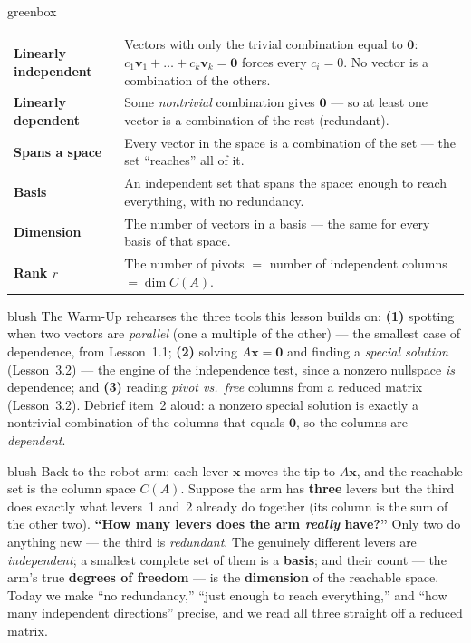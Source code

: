 \documentclass[10pt]{article}
\newcommand{\vv}{\mathbf{v}}
\newcommand{\xx}{\mathbf{x}}
\newcommand{\zero}{\mathbf{0}}
\begin{document}
\begin{skillbox}{greenbox}
\renewcommand{\arraystretch}{1.3}
\begin{tabularx}{\linewidth}{@{}l X@{}}
\textbf{Linearly independent} & Vectors with only the trivial combination equal to $\zero$: $c_1\vv_1+\dots+c_k\vv_k=\zero$ forces every $c_i=0$. No vector is a combination of the others. \\
\textbf{Linearly dependent} & Some \emph{nontrivial} combination gives $\zero$ --- so at least one vector is a combination of the rest (redundant). \\
\textbf{Spans a space} & Every vector in the space is a combination of the set --- the set ``reaches'' all of it. \\
\textbf{Basis} & An independent set that spans the space: enough to reach everything, with no redundancy. \\
\textbf{Dimension} & The number of vectors in a basis --- the same for every basis of that space. \\
\textbf{Rank $r$} & The number of pivots $=$ number of independent columns $=\dim C(A)$. \\
\end{tabularx}
\end{skillbox}

\begin{fixedskillbox}{blush}
    The Warm-Up rehearses the three tools this lesson builds on: \textbf{(1)} spotting when two vectors are
    \emph{parallel} (one a multiple of the other) --- the smallest case of dependence, from Lesson~1.1;
    \textbf{(2)} solving $A\xx=\zero$ and finding a \emph{special solution} (Lesson~3.2) --- the engine of
    the independence test, since a nonzero nullspace \emph{is} dependence; and \textbf{(3)} reading
    \emph{pivot vs.\ free} columns from a reduced matrix (Lesson~3.2). Debrief item~2 aloud: a nonzero
    special solution is exactly a nontrivial combination of the columns that equals $\zero$, so the columns
    are \emph{dependent}.
\end{fixedskillbox}

\begin{skillbox}[Hook]{blush}
    Back to the robot arm: each lever $\xx$ moves the tip to $A\xx$, and the reachable set is the column
    space $C(A)$. Suppose the arm has \textbf{three} levers but the third does exactly what levers~1 and~2
    already do together (its column is the sum of the other two). \textbf{``How many levers does the arm
    \emph{really} have?''} Only two do anything new --- the third is \emph{redundant}. The genuinely
    different levers are \emph{independent}; a smallest complete set of them is a \textbf{basis}; and their
    count --- the arm's true \textbf{degrees of freedom} --- is the \textbf{dimension} of the reachable
    space. Today we make ``no redundancy,'' ``just enough to reach everything,'' and ``how many independent
    directions'' precise, and we read all three straight off a reduced matrix.
\end{skillbox}
\end{document}

